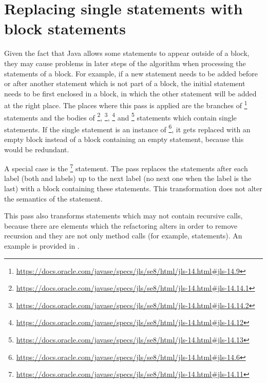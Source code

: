 \section{Replacing single statements with block statements}

Given the fact that Java allows some statements to appear outside of a block, they may cause problems in later steps of
the algorithm when processing the statements of a block. For example, if a new statement needs to be added before or
after another statement which is not part of a block, the initial statement needs to be first enclosed in a block, in
which the other statement will be added at the right place.
The places where this pass is applied are the branches of
\footnote{\url{https://docs.oracle.com/javase/specs/jls/se8/html/jls-14.html#jls-14.9}} statements and the
bodies of \footnote{\url{https://docs.oracle.com/javase/specs/jls/se8/html/jls-14.html#jls-14.14.1}},
\footnote{\url{https://docs.oracle.com/javase/specs/jls/se8/html/jls-14.html#jls-14.14.2}},
\footnote{\url{https://docs.oracle.com/javase/specs/jls/se8/html/jls-14.html#jls-14.12}} and
\footnote{\url{https://docs.oracle.com/javase/specs/jls/se8/html/jls-14.html#jls-14.13}} statements
which contain single statements. If the single statement is an instance of
\footnote{\url{https://docs.oracle.com/javase/specs/jls/se8/html/jls-14.html#jls-14.6}},
it gets replaced with an empty block instead of a block containing an empty statement, because this would be redundant.

A special case is the \footnote{\url{https://docs.oracle.com/javase/specs/jls/se8/html/jls-14.html#jls-14.11}}
statement. The pass replaces the statements after each  label (both  and  labels)
up to the next  label (no next one when the label is the last) with a block containing these statements.
This transformation does not alter the semantics of the  statement.

This pass also transforms statements which may not contain recursive calls, because there are elements which the
refactoring alters in order to remove recursion and they are not only method calls (for example, 
statements). An example is provided in .

